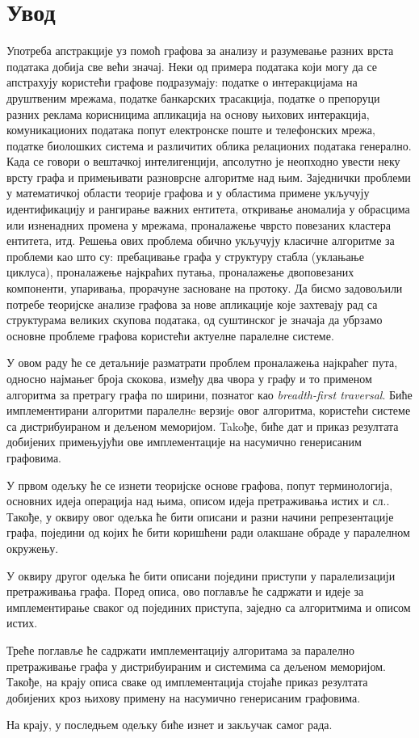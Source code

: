 \chapter*{Увод}
Употреба апстракције уз помоћ графова за анализу и разумевање разних врста података добија све већи значај. Неки од примера података који могу да се апстрахују користећи графове подразумају: податке о интеракцијама на друштвеним мрежама, податке банкарских трасакција, податке о препоруци разних реклама корисницима апликација на основу њихових интеракција, комуникационих података попут електронске поште и телефонских мрежа, податке биолошких система и различитих облика релационих података генерално. Када се говори о вештачкој интелигенцији, апсолутно је неопходно увести неку врсту графа и примењивати разноврсне алгоритме над њим. Заједнички проблеми у математичкој области теорије графова и у областима примене укључују идентификацију и рангирање важних ентитета, откривање аномалија у обрасцима или изненадних промена у мрежама, проналажење чврсто повезаних кластера ентитета, итд. Решења ових проблема обично укључују класичне алгоритме за проблеми као што су: пребацивање графа у структуру стабла (уклањање циклуса), проналажење најкраћих путања, проналажење двоповезаних компоненти, упаривања, прорачуне засноване на протоку. Да бисмо задовољили потребе теоријске анализе графова за нове апликације које захтевају рад са структурама великих скупова података, од суштинског је значаја да убрзамо основне проблеме графова користећи актуелне паралелне системе.

\par
У овом раду ће се детаљније разматрати проблем проналажења најкраћег пута, односно најмањег броја скокова, између два чвора у графу и то применом алгоритма за претрагу графа по ширини, познатог као \textit{breadth-first traversal}. Биће имплементирани алгоритми паралелнe верзијe овог алгоритма, користећи системе са дистрибуираном и дељеном меморијом. Takoђе, биће дат и приказ резултата добијених примењујући ове имплементације на насумично генерисаним графовима.

\par
У првом одељку ће се изнети теоријске основе графова, попут терминологија, основних идеја операција над њима, описом идеја претраживања истих и сл.. Такође, у оквиру овог одељка ће бити описани и разни начини репрезентације графа, поједини од којих ће бити коришћени ради олакшане обраде у паралелном окружењу.

\par
У оквиру другог одељка ће бити описани поједини приступи у паралелизацији претраживања графа. Поред описа, ово поглавље ће садржати и идеје за имплементирање сваког од појединих приступа, заједно са алгоритмима и описом истих. 

\par
Треће поглавље ће садржати имплементацију алгоритама за паралелно претраживање графа у дистрибуираним и системима са дељеном меморијом. Такође, на крају описа сваке од имплементација стојаће приказ резултата добијених кроз њихову примену на насумично генерисаним графовима.

\par
На крају, у последњем одељку биће изнет и закључак самог рада.